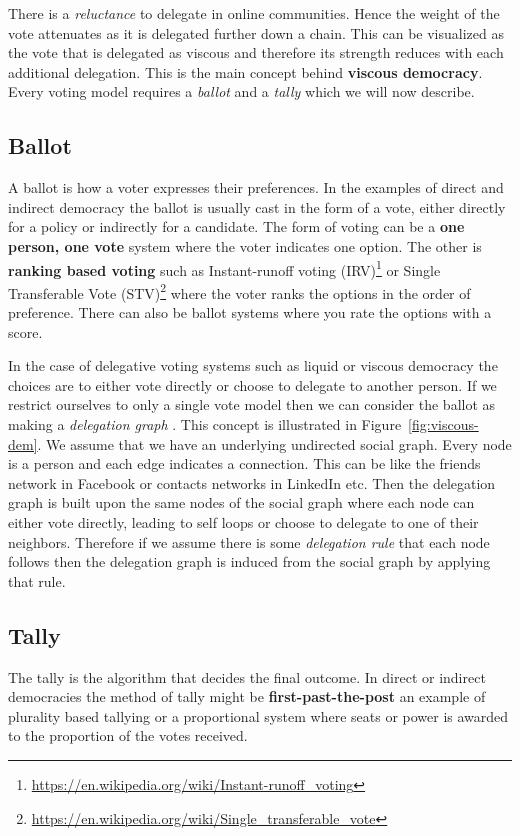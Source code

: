 There is a \textit{reluctance} to delegate in online communities. Hence the weight of the vote attenuates as it is delegated further down a chain. This can be visualized as the vote that is delegated as viscous and therefore its strength reduces with each additional delegation. This is the main concept behind \textbf{viscous democracy}. Every voting model requires a \emph{ballot} and a \emph{tally} which we will now describe.

\subsection{Ballot}
A ballot is how a voter expresses their preferences. In the examples of direct and indirect democracy the ballot is usually cast in the form of a vote, either directly for a policy or indirectly for a candidate. The form of voting can be a \textbf{one person, one vote} system where the voter indicates one option. The other is \textbf{ranking based voting} such as Instant-runoff voting (IRV)\footnote{\url{https://en.wikipedia.org/wiki/Instant-runoff_voting}} or Single Transferable Vote (STV)\footnote{\url{https://en.wikipedia.org/wiki/Single_transferable_vote}} where the voter ranks the options in the order of preference. There can also be ballot systems where you rate the options with a score.

In the case of delegative voting systems such as liquid or viscous democracy the choices are to either vote directly or choose to delegate to another person. If we restrict ourselves to only a single vote model then we can consider the ballot as making a \textit{delegation graph} \cite{ViscousDemocracy}. This concept is illustrated in Figure~\ref{fig:viscous-dem}. We assume that we have an underlying undirected social graph. Every node is a person and each edge indicates a connection. This can be like the friends network in Facebook or contacts networks in LinkedIn etc. Then the delegation graph is built upon the same nodes of the social graph where each node can either vote directly, leading to self loops or choose to delegate to one of their neighbors. Therefore if we assume there is some \textit{delegation rule} that each node follows then the delegation graph is induced from the social graph by applying that rule. 

\subsection{Tally}
\label{sec:tally}
The tally is the algorithm that decides the final outcome. In direct or indirect democracies the method of tally might be \textbf{first-past-the-post} an example of plurality based tallying or a proportional system where seats or power is awarded to the proportion of the votes received. 
 
